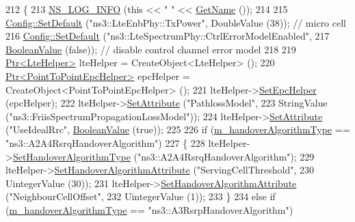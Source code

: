 \begin{DoxyCode}
212 \{
213   \hyperlink{group__logging_gafbd73ee2cf9f26b319f49086d8e860fb}{NS\_LOG\_INFO} (\textcolor{keyword}{this} << \textcolor{stringliteral}{" "} << \hyperlink{classns3_1_1TestCase_a28f7bb59669c24dae1c290fc17fc9b62}{GetName} ());
214 
215   \hyperlink{group__config_ga2e7882df849d8ba4aaad31c934c40c06}{Config::SetDefault} (\textcolor{stringliteral}{"ns3::LteEnbPhy::TxPower"}, DoubleValue (38)); \textcolor{comment}{// micro cell}
216   \hyperlink{group__config_ga2e7882df849d8ba4aaad31c934c40c06}{Config::SetDefault} (\textcolor{stringliteral}{"ns3::LteSpectrumPhy::CtrlErrorModelEnabled"},
217                       \hyperlink{classns3_1_1BooleanValue}{BooleanValue} (\textcolor{keyword}{false})); \textcolor{comment}{// disable control channel error model}
218 
219   \hyperlink{classns3_1_1Ptr}{Ptr<LteHelper>} lteHelper = CreateObject<LteHelper> ();
220   \hyperlink{classns3_1_1Ptr}{Ptr<PointToPointEpcHelper>} epcHelper = CreateObject<PointToPointEpcHelper> ();
221   lteHelper->\hyperlink{classns3_1_1LteHelper_a324079a1ccd54ce949786b83d6b95915}{SetEpcHelper} (epcHelper);
222   lteHelper->\hyperlink{classns3_1_1ObjectBase_ac60245d3ea4123bbc9b1d391f1f6592f}{SetAttribute} (\textcolor{stringliteral}{"PathlossModel"},
223                            StringValue (\textcolor{stringliteral}{"ns3::FriisSpectrumPropagationLossModel"}));
224   lteHelper->\hyperlink{classns3_1_1ObjectBase_ac60245d3ea4123bbc9b1d391f1f6592f}{SetAttribute} (\textcolor{stringliteral}{"UseIdealRrc"}, \hyperlink{classns3_1_1BooleanValue}{BooleanValue} (\textcolor{keyword}{true}));
225 
226   \textcolor{keywordflow}{if} (\hyperlink{classLteHandoverTargetTestCase_a2bc86aca3c0c446f90d26a572a58d2b9}{m\_handoverAlgorithmType} == \textcolor{stringliteral}{"ns3::A2A4RsrqHandoverAlgorithm"})
227     \{
228       lteHelper->\hyperlink{classns3_1_1LteHelper_a6301630b8a7082043efff2a7aaaa1d20}{SetHandoverAlgorithmType} (\textcolor{stringliteral}{"ns3::A2A4RsrqHandoverAlgorithm"});
229       lteHelper->\hyperlink{classns3_1_1LteHelper_a4da448bb1d3d13534cc54f6b7d33f26a}{SetHandoverAlgorithmAttribute} (\textcolor{stringliteral}{"ServingCellThreshold"},
230                                                 UintegerValue (30));
231       lteHelper->\hyperlink{classns3_1_1LteHelper_a4da448bb1d3d13534cc54f6b7d33f26a}{SetHandoverAlgorithmAttribute} (\textcolor{stringliteral}{"NeighbourCellOffset"},
232                                                 UintegerValue (1));
233     \}
234   \textcolor{keywordflow}{else} \textcolor{keywordflow}{if} (\hyperlink{classLteHandoverTargetTestCase_a2bc86aca3c0c446f90d26a572a58d2b9}{m\_handoverAlgorithmType} == \textcolor{stringliteral}{"ns3::A3RsrpHandoverAlgorithm"})

\end{DoxyCode}
